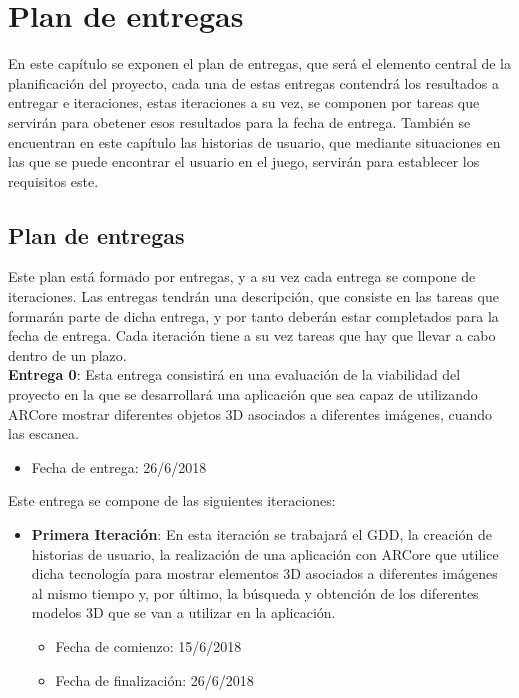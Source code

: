 \chapter{Plan de entregas}
\label{ch:plan}
En este capítulo se exponen el plan de entregas, que será el elemento central de la planificación del proyecto, cada una de estas entregas contendrá los resultados a entregar e iteraciones, estas iteraciones a su vez, se componen por tareas que servirán para obetener esos resultados para la fecha de entrega. También se encuentran en este capítulo las historias de usuario, que mediante situaciones en las que se puede encontrar el usuario en el juego, servirán para establecer los requisitos este.


\section{Plan de entregas}
Este plan está formado por entregas, y a su vez cada entrega se compone de iteraciones. Las entregas tendrán una descripción, que consiste en las tareas que formarán parte de dicha entrega, y por tanto deberán estar completados para la fecha de entrega. Cada iteración tiene a su vez tareas que hay que llevar a cabo dentro de un plazo.\\

\textbf{Entrega 0}: Esta entrega consistirá en una evaluación de la viabilidad del proyecto en la que se desarrollará una aplicación que sea capaz de utilizando ARCore mostrar diferentes objetos 3D asociados a diferentes imágenes, cuando las escanea.

\begin{itemize}
  \item Fecha de entrega: 26/6/2018
\end{itemize}

\hfill

Este entrega se compone de las siguientes iteraciones:

\begin{itemize}
  \item \textbf{Primera Iteración}: En esta iteración se trabajará el GDD, la creación de historias de usuario, la realización de una aplicación con ARCore que utilice dicha tecnología para mostrar elementos 3D asociados a diferentes imágenes al mismo tiempo y, por último, la búsqueda y obtención de los diferentes modelos 3D que se van a utilizar en la aplicación.

  \begin{itemize}
    \item Fecha de comienzo: 15/6/2018
    \item Fecha de finalización: 26/6/2018
  \end{itemize}

\end{itemize}

